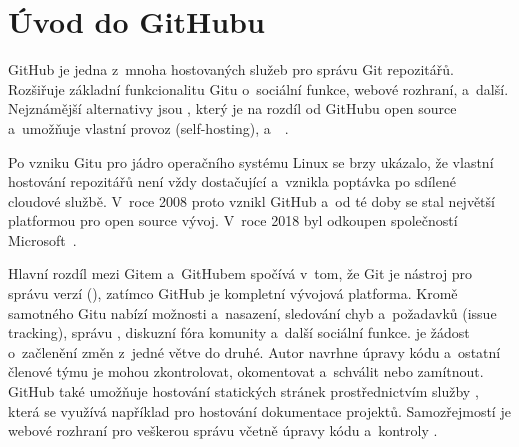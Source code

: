 
\section{Úvod do GitHubu}
\label{sec:github_introduction}
GitHub je jedna z~mnoha hostovaných služeb pro správu Git repozitářů. Rozšiřuje základní funkcionalitu Gitu o~sociální funkce, webové rozhraní, \CICD a~další.
Nejznámější alternativy jsou , který je na rozdíl od GitHubu open source a~umožňuje vlastní provoz (self-hosting), a~~\cite{psl_git_tutorial_main}.

Po vzniku Gitu pro jádro operačního systému Linux se brzy ukázalo, že vlastní hostování repozitářů není vždy dostačující a~vznikla poptávka po sdílené cloudové službě. V~roce 2008 proto vznikl GitHub a~od té doby se stal největší platformou pro open source vývoj. V~roce 2018 byl odkoupen společností Microsoft~\cite{psl_git_tutorial_main}.

Hlavní rozdíl mezi Gitem a~GitHubem spočívá v~tom, že Git je nástroj pro správu verzí (\VCS), zatímco GitHub je kompletní vývojová platforma. Kromě samotného Gitu nabízí možnosti \CICD a~nasazení, sledování chyb a~požadavků (issue tracking), správu \PR, diskuzní fóra komunity a~další sociální funkce. \PR je žádost o~začlenění změn z~jedné větve do druhé. Autor navrhne úpravy kódu a~ostatní členové týmu je mohou zkontrolovat, okomentovat a~schválit nebo zamítnout. GitHub také umožňuje hostování statických stránek prostřednictvím služby , která se využívá například pro hostování dokumentace projektů. Samozřejmostí je webové rozhraní pro veškerou správu včetně úpravy kódu a~kontroly \PR.
